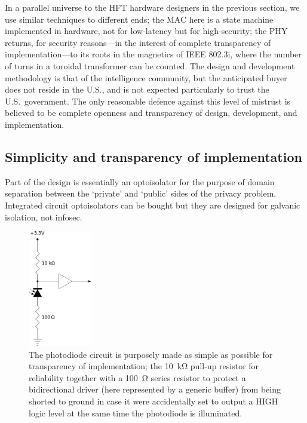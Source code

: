 \documentclass[conference]{IEEEtran}
\begin{document}
In a parallel universe to the HFT hardware designers in the previous section,
we use similar techniques to different ends; the MAC here is a state machine
implemented in hardware, not for low-latency but for high-security; the PHY
returns, for security reasons---in the interest of complete transparency of
implementation---to its roots in the magnetics of IEEE 802.3i, where the
number of turns in a toroidal transformer can be counted. The design and
development methodology is that of the intelligence community, but the
anticipated buyer does not reside in the U.S., and is not expected
particularly to trust the U.S.\ government. The only reasonable defence
against this level of mistrust is believed to be complete openness and
transparency of design, development, and implementation.

\subsection{Simplicity and transparency of implementation}

Part of the design is essentially an optoisolator for the purpose of domain
separation between the `private' and `public' sides of the privacy problem.
Integrated circuit optoisolators can be bought but they are designed for
galvanic isolation, not infosec.

\begin{figure}[!t]
    \centering
	\includegraphics[height=2in]{graphics/photodiode_pullup_and_GPIO_protection.png}
	\caption{The photodiode circuit is purposely made as simple as possible
        for transparency of implementation; the \SI{10}{\kilo\ohm} pull-up
        resistor for reliability together with a \SI{100}{\ohm} series
        resistor to protect a bidirectional driver (here represented by a
        generic buffer) from being shorted to ground in case it were
        accidentally set to output a HIGH logic level at the same time the
        photodiode is illuminated.}
	\label{figure:photodiode_pullup}
\end{figure}
\end{document}

